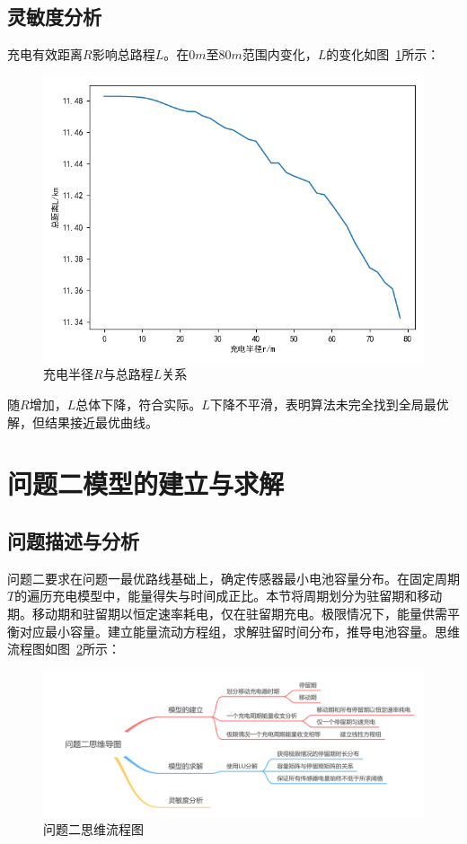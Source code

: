 \documentclass{whutmod}
\begin{document}
        \subsection{灵敏度分析}
            充电有效距离$R$影响总路程$L$。在$0m$至$80m$范围内变化，$L$的变化如图~\ref{ssssssssssssss}所示：

            \begin{figure}[H]
                \centering
                \includegraphics[width=.8\textwidth]{figures/ssss.png}
                \caption{充电半径$R$与总路程$L$关系}\label{ssssssssssssss}
            \end{figure}

            随$R$增加，$L$总体下降，符合实际。$L$下降不平滑，表明算法未完全找到全局最优解，但结果接近最优曲线。

    \section{问题二模型的建立与求解}
        \subsection{问题描述与分析}
            问题二要求在问题一最优路线基础上，确定传感器最小电池容量分布。在固定周期$T$的遍历充电模型中，能量得失与时间成正比。本节将周期划分为驻留期和移动期。移动期和驻留期以恒定速率耗电，仅在驻留期充电。极限情况下，能量供需平衡对应最小容量。建立能量流动方程组，求解驻留时间分布，推导电池容量。思维流程图如图~\ref{ssssct}所示：

            \begin{figure}[H]
                \centering
                \includegraphics[width=\textwidth]{figures/222222.png}
                \caption{问题二思维流程图}\label{ssssct}
            \end{figure}
\end{document}
